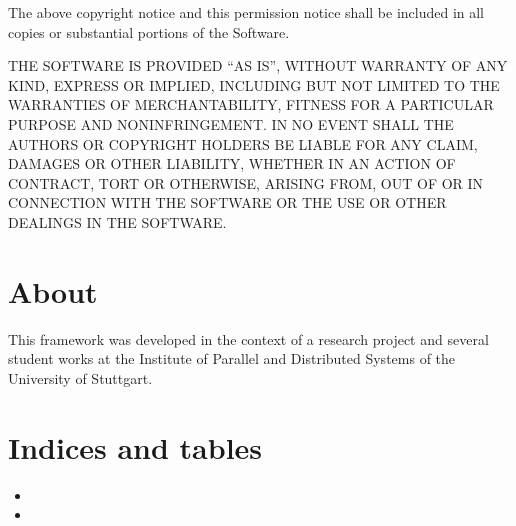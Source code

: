 \documentclass[letterpaper,10pt,english]{sphinxmanual}
\begin{document}
\sphinxAtStartPar
The above copyright notice and this permission notice shall be included in all
copies or substantial portions of the Software.

\sphinxAtStartPar
THE SOFTWARE IS PROVIDED “AS IS”, WITHOUT WARRANTY OF ANY KIND, EXPRESS OR
IMPLIED, INCLUDING BUT NOT LIMITED TO THE WARRANTIES OF MERCHANTABILITY,
FITNESS FOR A PARTICULAR PURPOSE AND NONINFRINGEMENT. IN NO EVENT SHALL THE
AUTHORS OR COPYRIGHT HOLDERS BE LIABLE FOR ANY CLAIM, DAMAGES OR OTHER
LIABILITY, WHETHER IN AN ACTION OF CONTRACT, TORT OR OTHERWISE, ARISING FROM,
OUT OF OR IN CONNECTION WITH THE SOFTWARE OR THE USE OR OTHER DEALINGS IN THE
SOFTWARE.


\chapter{About}
\label{\detokenize{about:about}}\label{\detokenize{about::doc}}
\sphinxAtStartPar
This framework was developed in the context of a research project and several student works at the Institute of Parallel and Distributed Systems of the University of Stuttgart.


\chapter{Indices and tables}
\label{\detokenize{index:indices-and-tables}}\begin{itemize}
\item {} 
\sphinxAtStartPar
{}

\item {} 
\sphinxAtStartPar
{}

\end{itemize}
\end{document}
